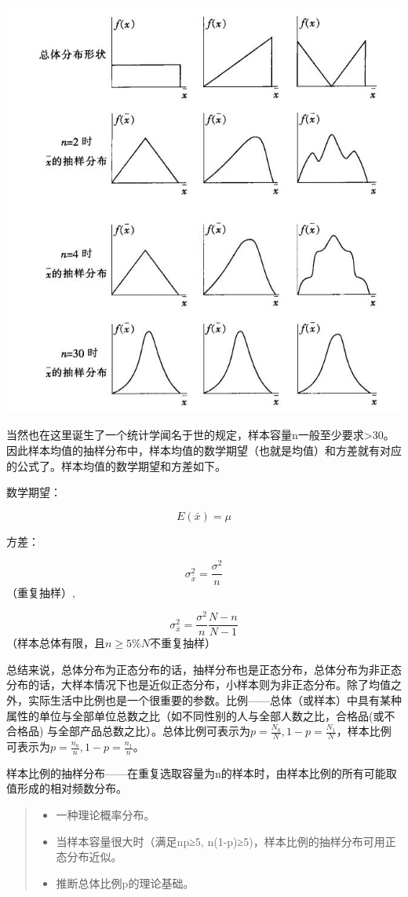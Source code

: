 \documentclass[]{ctexbook}
\providecommand{\tightlist}{%
  \setlength{\itemsep}{0pt}\setlength{\parskip}{0pt}}
\begin{document}
\includegraphics[width=1\linewidth,height=0.6\textheight]{fig/fig7}

当然也在这里诞生了一个统计学闻名于世的规定，样本容量n一般至少要求\textgreater30。因此样本均值的抽样分布中，样本均值的数学期望（也就是均值）和方差就有对应的公式了。样本均值的数学期望和方差如下。

数学期望：

\[E(\bar x) =\mu\]

方差：

\[\sigma_{\bar x}^2=\frac{\sigma^2}{n}\] （重复抽样）,

\[\sigma_{\bar x}^2=\frac{\sigma^2}{n}\frac{N-n}{N-1}\]（样本总体有限，且\(n\ge 5\%N\)不重复抽样）

总结来说，总体分布为正态分布的话，抽样分布也是正态分布，总体分布为非正态分布的话，大样本情况下也是近似正态分布，小样本则为非正态分布。除了均值之外，实际生活中比例也是一个很重要的参数。比例------总体（或样本）中具有某种属性的单位与全部单位总数之比（如不同性别的人与全部人数之比，合格品(或不合格品) 与全部产品总数之比）。总体比例可表示为\(p=\frac{N_0}{N},1-p=\frac{N_1}{N}\)，样本比例可表示为\(p=\frac{n_0}{n},1-p=\frac{n_1}{n}\)。

样本比例的抽样分布------在重复选取容量为n的样本时，由样本比例的所有可能取值形成的相对频数分布。

\begin{quote}
\begin{itemize}
\tightlist
\item
  一种理论概率分布。
\item
  当样本容量很大时（满足np≥5, n(1-p)≥5)，样本比例的抽样分布可用正态分布近似。
\item
  推断总体比例p的理论基础。
\end{itemize}
\end{quote}
\end{document}
